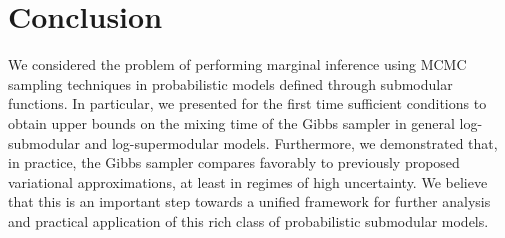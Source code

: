 

\section{Conclusion}
We considered the problem of performing marginal inference using MCMC sampling techniques in probabilistic models defined through submodular functions.
In particular, we presented for the first time sufficient conditions to obtain upper bounds on the mixing time of the Gibbs sampler in general log-submodular and log-supermodular models.
Furthermore, we demonstrated that, in practice, the Gibbs sampler compares favorably to previously proposed variational approximations, at least in regimes of high uncertainty.
We believe that this is an important step towards a unified framework for further analysis and practical application of this rich class of probabilistic submodular models.